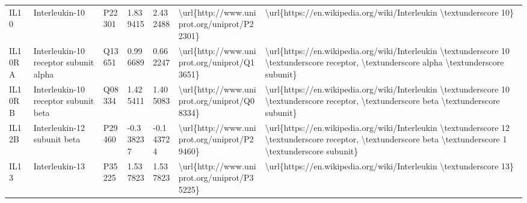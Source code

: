 \begin{table}[]
\begin{tabular}{lllllll}
\multicolumn{1}{l|}{IL10}     & Interleukin-10                                                & P22301  & 1.839415           & 2.432488          & \textbackslash{}url\{http://www.uniprot.org/uniprot/P22301\} & \textbackslash{}url\{https://en.wikipedia.org/wiki/Interleukin \textbackslash{}textunderscore 10\}                                                                                                                                                                                                 \\
\multicolumn{1}{l|}{IL10RA}   & Interleukin-10 receptor subunit alpha                         & Q13651  & 0.996689           & 0.662247          & \textbackslash{}url\{http://www.uniprot.org/uniprot/Q13651\} & \textbackslash{}url\{https://en.wikipedia.org/wiki/Interleukin \textbackslash{}textunderscore 10 \textbackslash{}textunderscore receptor, \textbackslash{}textunderscore alpha \textbackslash{}textunderscore subunit\}                                                                            \\
\multicolumn{1}{l|}{IL10RB}   & Interleukin-10 receptor subunit beta                          & Q08334  & 1.425411           & 1.405083          & \textbackslash{}url\{http://www.uniprot.org/uniprot/Q08334\} & \textbackslash{}url\{https://en.wikipedia.org/wiki/Interleukin \textbackslash{}textunderscore 10 \textbackslash{}textunderscore receptor, \textbackslash{}textunderscore beta \textbackslash{}textunderscore subunit\}                                                                             \\
\multicolumn{1}{l|}{IL12B}    & Interleukin-12 subunit beta                                   & P29460  & -0.338237          & -0.143724         & \textbackslash{}url\{http://www.uniprot.org/uniprot/P29460\} & \textbackslash{}url\{https://en.wikipedia.org/wiki/Interleukin \textbackslash{}textunderscore 12 \textbackslash{}textunderscore receptor, \textbackslash{}textunderscore beta \textbackslash{}textunderscore 1 \textbackslash{}textunderscore subunit\}                                            \\
\multicolumn{1}{l|}{IL13}     & Interleukin-13                                                & P35225  & 1.537823           & 1.537823          & \textbackslash{}url\{http://www.uniprot.org/uniprot/P35225\} & \textbackslash{}url\{https://en.wikipedia.org/wiki/Interleukin \textbackslash{}textunderscore 13\}                                                                                                                                                                                                 \\

\end{tabular}
\end{table}
